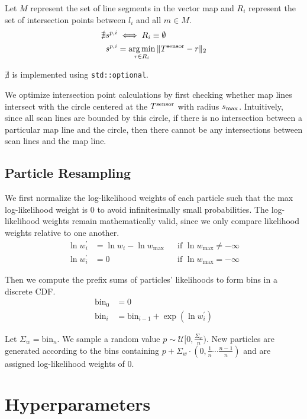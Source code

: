 \documentclass[11pt]{article}
\DeclareMathOperator*{\argmin}{arg\,min}
\begin{document}
\noindent
Let $M$ represent the set of line segments in the vector map and $R_i$ represent the set of
intersection points between $l_i$ and all $m \in M$.
\begin{align*}
    \nexists s^{p, i} &\iff R_i \equiv \emptyset \\
    s^{p, i} &= \argmin\limits_{r \in R_i} \| T^{\sensor} - r \|_2
\end{align*}

$\nexists$ is implemented using \texttt{std::optional}.

\noindent
We optimize intersection point calculations by first checking whether map lines
intersect with the circle centered at the $T^{\textrm{sensor}}$ with radius $s_{\textrm{max}}$.
Intuitively, since all scan lines are bounded by this circle, if there is no
intersection between a particular map line and the circle, then there cannot be
any intersections between scan lines and the map line.

\subsection{Particle Resampling}

We first normalize the log-likelihood weights of each particle such that the max
log-likelihood weight is 0 to avoid infinitesimally small probabilities. The
log-likelihood weights remain mathematically valid, since we only compare
likelihood weights relative to one another.
\begin{align*}
    \ln w_{i}^{\prime} &=\ln w_{i}-\ln w_{\max} && \textrm{if\ } \ln w_{\max} \ne -\infty \\
    \ln w_{i}^{\prime} &= 0 && \textrm{if\ } \ln w_{\max} = -\infty
\end{align*}

\noindent
Then we compute the prefix sums of particles' likelihoods to form bins in a
discrete CDF.
\begin{align*}
    \textrm{bin}_{0} &= 0 \\
    \textrm{bin}_i &= \textrm{bin}_{i - 1} + \exp{(\ln w_{i}^{\prime})}
\end{align*}

\noindent
Let $\Sigma_w = \textrm{bin}_n$. We sample a random value $p \sim \mathcal{U}[0,
\frac{\Sigma_w}{n})$. New particles are generated according to the bins
containing $p + \Sigma_w \cdot (0, \frac{1}{n} \cdots \frac{n - 1}{n})$ and are
assigned log-likelihood weights of 0.

\section{Hyperparameters}
\end{document}
